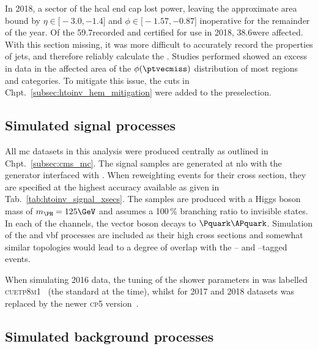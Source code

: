 In 2018, a sector of the \acrshort{hcal} end cap lost power, leaving the approximate area bound by $\eta \in \text{[}-\text{3.0}, -\text{1.4}\text{]}$ and $\phi \in \text{[}-\text{1.57}, -\text{0.87}\text{]}$ inoperative for the remainder of the year. Of the 59.7\fbinv recorded and certified for use in 2018, 38.6\fbinv were affected. With this section missing, it was more difficult to accurately record the properties of \glspl{jet}, and therefore reliably calculate the \ptvecmiss. Studies performed showed an excess in data in the affected area of the $\phi(\ptvecmiss)$ distribution of most regions and categories. To mitigate this issue, the cuts in Chpt.~\ref{subsec:htoinv_hem_mitigation} were added to the preselection.




\subsection{Simulated signal processes}
\label{subsec:htoinv_signal}

All \acrlong{mc} datasets in this analysis were produced centrally as outlined in Chpt.~\ref{subsec:cms_mc}. The signal samples are generated at \acrshort{nlo} with the \POWHEG generator interfaced with \PYTHIAEIGHT. When reweighting events for their cross section, they are specified at the highest accuracy available as given in Tab.~\ref{tab:htoinv_signal_xsecs}. The samples are produced with a Higgs boson mass of $m_{\PH} = \text{125}\GeV$ and assumes a 100\,\% branching ratio to invisible states. In each of the \VH channels, the vector boson decays to $\Pquark\APquark$. Simulation of the \ggH and \acrshort{vbf} processes are included as their high cross sections and somewhat similar topologies would lead to a degree of overlap with the \ttH-- and \VH--tagged events.

When simulating 2016 data, the tuning of the shower parameters in \PYTHIA was labelled \textsc{cuetp8m1}~\cite{Khachatryan:2015pea} (the standard at the time), whilst for 2017 and 2018 datasets was replaced by the newer \textsc{cp5} version~\cite{Sirunyan:2019dfx}.




\subsection{Simulated background processes}
\label{subsec:htoinv_background}


